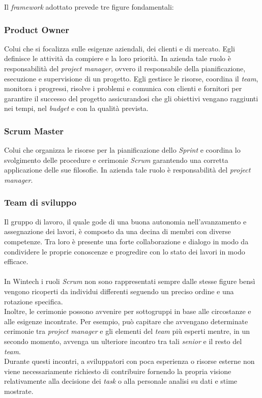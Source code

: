 \noindent Il \emph{framework} adottato prevede tre figure fondamentali: 
\subsubsection*{Product Owner}
Colui che si focalizza sulle esigenze aziendali, dei clienti e di mercato. Egli definisce le attività da compiere e la loro priorità.
In azienda tale ruolo è responsabilità del \emph{project manager}, ovvero il responsabile della pianificazione, esecuzione e supervisione di un progetto. Egli gestisce le risorse, coordina il \emph{team}, monitora i progressi, risolve i problemi e comunica con clienti e fornitori per garantire il successo del progetto assicurandosi che gli obiettivi vengano raggiunti nei tempi, nel \emph{budget} e con la qualità prevista.  

\subsubsection*{Scrum Master}
Colui che organizza le risorse per la pianificazione dello \emph{Sprint} e coordina lo svolgimento delle procedure e cerimonie \emph{Scrum} garantendo una corretta applicazione delle sue filosofie.
In azienda tale ruolo è responsabilità del \emph{project manager}. 

\subsubsection*{Team di sviluppo}
Il gruppo di lavoro, il quale gode di una buona autonomia nell'avanzamento e assegnazione dei lavori, è composto da una decina di membri con diverse competenze. Tra loro è presente una forte collaborazione e dialogo in modo da condividere le proprie conoscenze e progredire con lo stato dei lavori in modo efficace.\\\\

\noindent In Wintech i ruoli \emph{Scrum} non sono rappresentati sempre dalle stesse figure bensì vengono ricoperti da individui differenti seguendo un preciso ordine e una rotazione specifica.\\
Inoltre, le cerimonie possono avvenire per sottogruppi in base alle circostanze e alle esigenze incontrate. Per esempio, può capitare che avvengano determinate cerimonie tra \emph{project manager} e gli elementi del \emph{team} più esperti mentre, in un secondo momento, avvenga un ulteriore incontro tra tali \emph{senior} e il resto del \emph{team}.\\
Durante questi incontri, a sviluppatori con poca esperienza o risorse esterne non viene necessariamente richiesto di contribuire fornendo la propria visione relativamente alla decisione dei \emph{task} o alla personale analisi su dati e stime mostrate.\\\\

